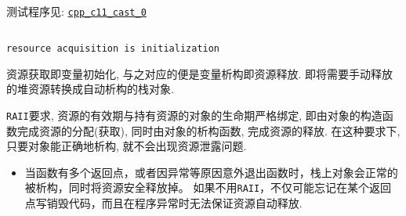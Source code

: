 测试程序见: \href{https://github.com/wenqingqian/Obtuse/tree/main/test/cpp/c++11/cast_0}{\tt cpp\_c11\_cast\_0}
\subsection{\color{purple}{智能指针}}
\subsubsection{\color{purple}{\tt RAII}}

{\tt resource acquisition is initialization}

资源获取即变量初始化, 与之对应的便是变量析构即资源释放. 即将需要手动释放的堆资源转换成自动析构的栈对象.

{\tt RAII}要求, 资源的有效期与持有资源的对象的生命期严格绑定, 即由对象的构造函数完成资源的分配(获取), 
同时由对象的析构函数, 完成资源的释放. 在这种要求下, 只要对象能正确地析构, 就不会出现资源泄露问题.

\begin{itemize}
	\item 当函数有多个返回点，或者因异常等原因意外退出函数时，栈上对象会正常的被析构，同时将资源安全释放掉。
			如果不用{\tt RAII}，不仅可能忘记在某个返回点写销毁代码，而且在程序异常时无法保证资源自动释放.
\end{itemize}
